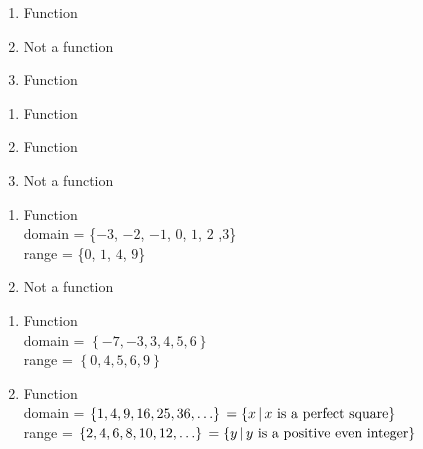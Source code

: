 \documentclass{ximera}
\begin{document}
\begin{multicols}{3}
\begin{enumerate}
\setcounter{enumi}{\value{HW}}

\item   Function
\item   Not a function
\item Function

\setcounter{HW}{\value{enumi}}
\end{enumerate}
\end{multicols}

\begin{multicols}{3}
\begin{enumerate}
\setcounter{enumi}{\value{HW}}

\item Function
\item  Function
\item Not a function

\setcounter{HW}{\value{enumi}}
\end{enumerate}
\end{multicols}


\begin{multicols}{2}
\begin{enumerate}
\setcounter{enumi}{\value{HW}}

\item Function \\ domain = \{$-3$, $-2$, $-1$, $0$, $1$, $2$ ,$3$\} \\ range = \{$0$, $1$, $4$, $9$\}

\vfill

\columnbreak

\item Not a function

\setcounter{HW}{\value{enumi}}
\end{enumerate}
\end{multicols}

\begin{multicols}{2}
\begin{enumerate}
\setcounter{enumi}{\value{HW}}

\item  Function \\ domain = $\left\{ -7, -3, 3, 4, 5, 6 \right\}$ \\ range = $\left\{ 0,4,5,6,9 \right\}$


\vfill

\columnbreak

\item  Function \\ domain =   $\left\{ 1, 4, 9, 16, 25, 36, \ldots \right\} \\ = \left\{ x \, | \, \text{$x$ is a perfect square} \right\}$ \\ range =  $\left\{ 2, 4, 6, 8, 10, 12, \ldots \right\} \\ = \left\{ y \, | \, \text{$y$ is a positive even integer} \right\}$

\setcounter{HW}{\value{enumi}}
\end{enumerate}
\end{multicols}
\end{document}
